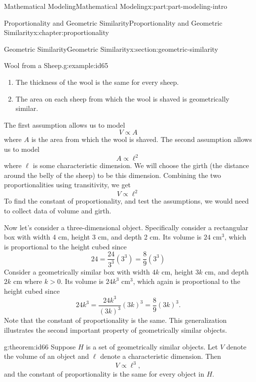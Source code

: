 \documentclass[oneside,10pt,]{book}
\numberwithin{equation}{section}
\begin{document}
\begin{partptx}{Mathematical Modeling}{}{Mathematical Modeling}{}{}{x:part:part-modeling-intro}
\begin{chapterptx}{Proportionality and Geometric Similarity}{}{Proportionality and Geometric Similarity}{}{}{x:chapter:proportionality}
\begin{sectionptx}{Geometric Similarity}{}{Geometric Similarity}{}{}{x:section:geometric-similarity}
\begin{example}{Wool from a Sheep.}{g:example:id65}
%
\begin{enumerate}
\item{}The thickness of the wool is the same for every sheep.%
\item{}The area on each sheep from which the wool is shaved is geometrically similar.%
\end{enumerate}
The first assumption allows us to model%
%
\begin{equation*}
V\propto A
\end{equation*}
where \(A\) is the area from which the wool is shaved. The second assumption allows us to model%
%
\begin{equation*}
A\propto \ell^2
\end{equation*}
where \(\ell\) is some characteristic dimension. We will choose the girth (the distance around the belly of the sheep) to be this dimension. Combining the two proportionalities using transitivity, we get%
%
\begin{equation*}
V\propto \ell^2
\end{equation*}
To find the constant of proportionality, and test the assumptions, we would need to collect data of volume and girth.%
\end{example}
Now let’s consider a three-dimensional object. Specifically consider a rectangular box with width 4 cm, height 3 cm, and depth 2 cm. Its volume is \(24 \text{ cm}^3\), which is proportional to the height cubed since%
%
\begin{equation*}
24 = \frac{24}{3^3}(3^3) = \frac89(3^3)
\end{equation*}
Consider a geometrically similar box with width \(4k\) cm, height \(3k\) cm, and depth \(2k\) cm where \(k > 0\). Its volume is \(24k^3 \text{ cm}^3\), which again is proportional to the height cubed since%
%
\begin{equation*}
24k^3 = \frac{24k^3}{(3k)^3}(3k)^3 = \frac89(3k)^3.
\end{equation*}
Note that the constant of proportionality is the same. This generalization illustrates the second important property of geometrically similar objects.%
\begin{theorem}{}{}{g:theorem:id66}%
Suppose \(H\) is a set of geometrically similar objects. Let \(V\) denote the volume of an object and \(\ell\) denote a characteristic dimension. Then%
%
\begin{equation*}
V\propto \ell^3,
\end{equation*}
and the constant of proportionality is the same for every object in \(H\).%
\end{theorem}

\end{sectionptx}
\end{chapterptx}
\end{partptx}
\end{document}
